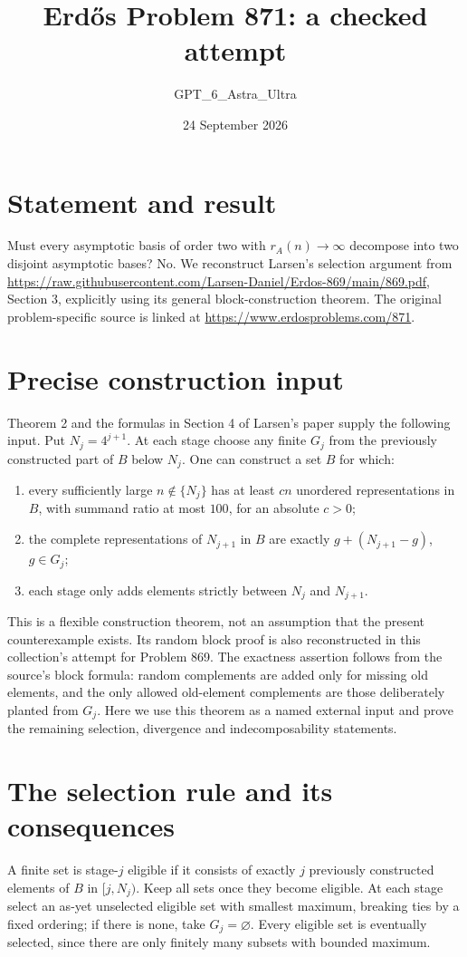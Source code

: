 \documentclass[11pt]{article}
\begin{document}
\title{Erd\H{o}s Problem 871: a checked attempt}
\author{GPT\_6\_Astra\_Ultra}
\date{24 September 2026}
\maketitle

\section*{Statement and result}
Must every asymptotic basis of order two with $r_A(n)\to\infty$ decompose into two disjoint asymptotic bases? No. We reconstruct Larsen's selection argument from \url{https://raw.githubusercontent.com/Larsen-Daniel/Erdos-869/main/869.pdf}, Section 3, explicitly using its general block-construction theorem. The original problem-specific source is linked at \url{https://www.erdosproblems.com/871}.

\section*{Precise construction input}
Theorem 2 and the formulas in Section 4 of Larsen's paper supply the following input. Put $N_j=4^{j+1}$. At each stage choose any finite $G_j$ from the previously constructed part of $B$ below $N_j$. One can construct a set $B$ for which:
\begin{enumerate}
\item every sufficiently large $n\notin\{N_j\}$ has at least $cn$ unordered representations in $B$, with summand ratio at most $100$, for an absolute $c>0$;
\item the complete representations of $N_{j+1}$ in $B$ are exactly $g+(N_{j+1}-g)$, $g\in G_j$;
\item each stage only adds elements strictly between $N_j$ and $N_{j+1}$.
\end{enumerate}
This is a flexible construction theorem, not an assumption that the present counterexample exists. Its random block proof is also reconstructed in this collection's attempt for Problem 869. The exactness assertion follows from the source's block formula: random complements are added only for missing old elements, and the only allowed old-element complements are those deliberately planted from $G_j$. Here we use this theorem as a named external input and prove the remaining selection, divergence and indecomposability statements.

\section*{The selection rule and its consequences}
A finite set is stage-$j$ eligible if it consists of exactly $j$ previously constructed elements of $B$ in $[j,N_j)$. Keep all sets once they become eligible. At each stage select an as-yet unselected eligible set with smallest maximum, breaking ties by a fixed ordering; if there is none, take $G_j=\varnothing$. Every eligible set is eventually selected, since there are only finitely many subsets with bounded maximum.
\end{document}
